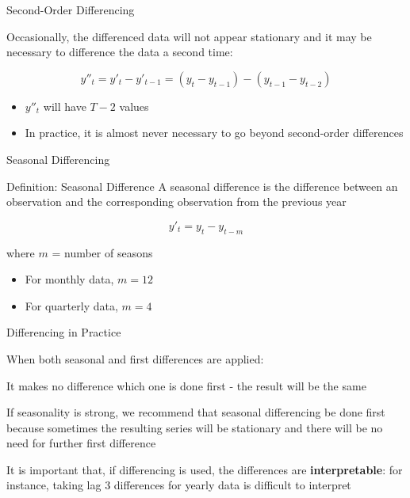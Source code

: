 \documentclass{beamer}
\newenvironment{wideitemize}{\itemize\addtolength{\itemsep}{10pt}}{\enditemize}
\begin{document}
\begin{frame}{Second-Order Differencing}

  Occasionally, the differenced data will not appear stationary and it may be necessary to difference the data a second time:\\

  \medskip
  
  \begin{equation*}
    y''_{t} = y'_t - y'_{t-1} = (y_t - y_{t-1}) - (y_{t-1} - y_{t-2})
  \end{equation*}

  \medskip

  \begin{itemize}
  \item $y''_{t}$ will have $T-2$ values
  \item In practice, it is almost never necessary to go beyond second-order differences
  \end{itemize}
  
\end{frame}


\begin{frame}{Seasonal Differencing}

  \begin{block}{Definition: Seasonal Difference}
    A seasonal difference is the difference between an observation and the corresponding observation from the previous year

    \begin{equation*}
      y'_t = y_t - y_{t-m}
    \end{equation*}

    where $m$ = number of seasons


    \begin{itemize}
    \item For monthly data, $m = 12$
    \item For quarterly data, $m = 4$      
    \end{itemize}
    
  \end{block}
\end{frame}


\begin{frame}{Differencing in Practice}

  When both seasonal and first differences are applied:

  \begin{wideitemize}
    \item It makes no difference which one is done first - the result will be the same
    \item If seasonality is strong, we recommend that seasonal differencing be done first because sometimes the resulting series will be stationary and there will be no need for further first difference
    \item It is important that, if differencing is used, the differences are \textbf{interpretable}: for instance, taking lag 3 differences for yearly data is difficult to interpret
  \end{wideitemize}
\end{frame}
\end{document}
